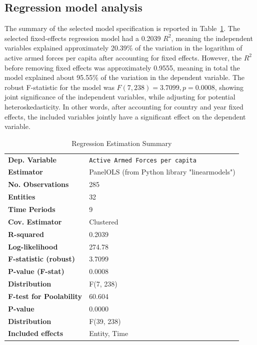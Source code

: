 \subsection{Regression model analysis}

The summary of the selected model specification is reported in Table~\ref{tab:model_summary}.
The selected fixed-effects regression model had a 0.2039 $R^2$, meaning the independent variables explained approximately 20.39\% of the variation in the logarithm of active armed forces per capita after accounting for fixed effects. 
However, the $R^2$ before removing fixed effects was approximately 0.9555, meaning in total the model explained about 95.55\% of the variation in the dependent variable.
The robust F-statistic for the model was $F(7, 238)=3.7099, p=0.0008$, showing joint significance of the independent variables, while adjusting for potential heteroskedasticity.
In other words, after accounting for country and year fixed effects, the included variables jointly have a significant effect on the dependent variable.

\renewcommand{\arraystretch}{1.3}

\begin{table}[htbp]
\caption{Regression Estimation Summary}
\centering
\begin{threeparttable}
\begin{tabularx}{\textwidth}{@{}lX@{}}
\toprule
\textbf{Dep. Variable} & \texttt{Active Armed Forces per capita} \\
\textbf{Estimator} & PanelOLS (from Python library "linearmodels") \\
\textbf{No. Observations} & 285 \\
\textbf{Entities} & 32 \\
\textbf{Time Periods} & 9 \\
\textbf{Cov. Estimator} & Clustered \\
\midrule
\textbf{R-squared} & 0.2039 \\
\textbf{Log-likelihood} & 274.78 \\
\textbf{F-statistic (robust)} & 3.7099 \\
\textbf{P-value (F-stat)} & 0.0008 \\
\textbf{Distribution} & F(7, 238) \\
\midrule
\textbf{F-test for Poolability} & 60.604 \\
\textbf{P-value} & 0.0000 \\
\textbf{Distribution} & F(39, 238) \\
\textbf{Included effects} & Entity, Time \\
\bottomrule
\end{tabularx}
\end{threeparttable}
\label{tab:model_summary}
\end{table} 

